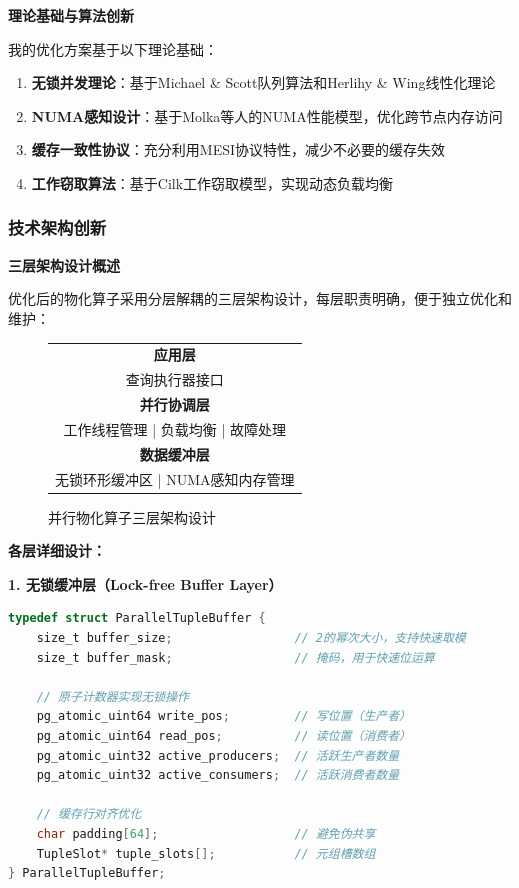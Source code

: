 \textbf{理论基础与算法创新}

我的优化方案基于以下理论基础：

\begin{enumerate}
    \item \textbf{无锁并发理论}：基于Michael \& Scott队列算法和Herlihy \& Wing线性化理论
    \item \textbf{NUMA感知设计}：基于Molka等人的NUMA性能模型，优化跨节点内存访问
    \item \textbf{缓存一致性协议}：充分利用MESI协议特性，减少不必要的缓存失效
    \item \textbf{工作窃取算法}：基于Cilk工作窃取模型，实现动态负载均衡
\end{enumerate}

\subsubsection{技术架构创新}

\textbf{三层架构设计概述}

优化后的物化算子采用分层解耦的三层架构设计，每层职责明确，便于独立优化和维护：

\begin{figure}[htbp]
\centering
\begin{tabular}{|c|}
\hline
\textbf{应用层} \\
查询执行器接口 \\
\hline
\textbf{并行协调层} \\
工作线程管理 | 负载均衡 | 故障处理 \\
\hline
\textbf{数据缓冲层} \\
无锁环形缓冲区 | NUMA感知内存管理 \\
\hline
\end{tabular}
\caption{并行物化算子三层架构设计}
\end{figure}

\textbf{各层详细设计：}

\textbf{1. 无锁缓冲层（Lock-free Buffer Layer）}
\begin{lstlisting}[language=C, caption=无锁环形缓冲区结构]
typedef struct ParallelTupleBuffer {
    size_t buffer_size;                 // 2的幂次大小，支持快速取模
    size_t buffer_mask;                 // 掩码，用于快速位运算
    
    // 原子计数器实现无锁操作
    pg_atomic_uint64 write_pos;         // 写位置（生产者）
    pg_atomic_uint64 read_pos;          // 读位置（消费者）
    pg_atomic_uint32 active_producers;  // 活跃生产者数量
    pg_atomic_uint32 active_consumers;  // 活跃消费者数量
    
    // 缓存行对齐优化
    char padding[64];                   // 避免伪共享
    TupleSlot* tuple_slots[];           // 元组槽数组
} ParallelTupleBuffer;
\end{lstlisting}

